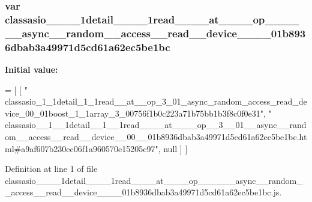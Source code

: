 \subsubsection[{classasio\+\_\+\+\_\+1\+\_\+\+\_\+1detail\+\_\+\+\_\+1\+\_\+\+\_\+1read\+\_\+\+\_\+\+\_\+\+\_\+at\+\_\+\+\_\+\+\_\+\+\_\+op\+\_\+\+\_\+3\+\_\+\+\_\+01\+\_\+\+\_\+async\+\_\+\+\_\+random\+\_\+\+\_\+access\+\_\+\+\_\+read\+\_\+\+\_\+device\+\_\+\+\_\+00\+\_\+\+\_\+01b8936dbab3a49971d5cd61a62ec5be1bc}]{\setlength{\rightskip}{0pt plus 5cm}var classasio\+\_\+\+\_\+\_\+\+\_\+1detail\+\_\+\+\_\+\_\+\+\_\+1read\+\_\+\+\_\+\+\_\+\+\_\+at\+\_\+\+\_\+\+\_\+\+\_\+op\+\_\+\+\_\+\_\+\+\_\+\_\+\+\_\+async\+\_\+\+\_\+random\+\_\+\+\_\+access\+\_\+\+\_\+read\+\_\+\+\_\+device\+\_\+\+\_\+\_\+\+\_\+01b8936dbab3a49971d5cd61a62ec5be1bc}\label{classasio____1____1detail____1____1read________at________op____3____01____async____random____accdd1f6f7a6cf88d94e72c2a28d5437ce1_a1e82f5b03127f1967e3efe5683b05b37}
{\bfseries Initial value\+:}
\begin{DoxyCode}
=
[
    [ \textcolor{stringliteral}{"
      classasio\_1\_1detail\_1\_1read\_\_at\_\_op\_3\_01\_async\_random\_access\_read\_device\_00\_01boost\_1\_1array\_3\_00756f1b0c223a71b75bb1b3f8c0f0e31"}, \textcolor{stringliteral}{"
      classasio\_\_1\_\_1detail\_\_1\_\_1read\_\_\_\_at\_\_\_\_op\_\_3\_\_01\_\_async\_\_random\_\_access\_\_read\_\_device\_\_00\_\_01b8936dbab3a49971d5cd61a62ec5be1bc.html#a9af607b230ec06f1a960570e15205c97"}, null ]
]
\end{DoxyCode}


Definition at line 1 of file classasio\+\_\+\+\_\+\_\+\+\_\+1detail\+\_\+\+\_\+\_\+\+\_\+1read\+\_\+\+\_\+\+\_\+\+\_\+at\+\_\+\+\_\+\+\_\+\+\_\+op\+\_\+\+\_\+\_\+\+\_\+\_\+\+\_\+async\+\_\+\+\_\+random\+\_\+\+\_\+access\+\_\+\+\_\+read\+\_\+\+\_\+device\+\_\+\+\_\+\_\+\+\_\+01b8936dbab3a49971d5cd61a62ec5be1bc.\+js.

